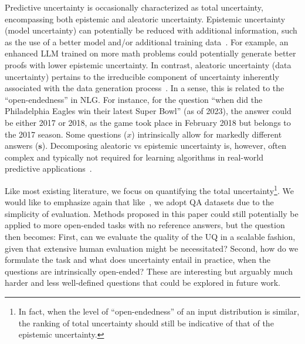 Predictive uncertainty is occasionally characterized as total uncertainty, encompassing both epistemic and aleatoric uncertainty. 
Epistemic uncertainty (model uncertainty) can potentially be reduced with additional information, such as the use of a better model and/or additional training data~\citep{hullermeier2021aleatoric,lahlou2023deup}. 
For example, an enhanced LLM trained on more math problems could potentially generate better proofs with lower epistemic uncertainty.
In contrast, aleatoric uncertainty (data uncertainty) pertains to the irreducible component of uncertainty inherently associated with the data generation process~\citep{10.1016/j.ins.2013.07.030}. 
In a sense, this is related to the ``open-endedness'' in NLG.
For instance, for the question ``when did the Philadelphia Eagles win their latest Super Bowl'' (as of 2023), the answer could be either 2017 or 2018, as the game took place in February 2018 but belongs to the 2017 season. 
Some questions ($x$) intrinsically allow for markedly different answers ($\mathbf{s}$). 
Decomposing aleatoric vs epistemic uncertainty is, however, often complex and typically not required for learning algorithms in real-world predictive applications~\citep{hullermeier2021aleatoric}.

Like most existing literature, we focus on quantifying the total uncertainty\footnote{In fact, when the level of ``open-endedness'' of an input distribution is similar, the ranking of total uncertainty should still be indicative of that of the epistemic uncertainty.}.
We would like to emphasize again that like~\cite{kuhn2023semantic}, we adopt QA datasets due to the simplicity of evaluation.
Methods proposed in this paper could still potentially be applied to more open-ended tasks with no reference answers, but the question then becomes: First, can we evaluate the quality of the UQ in a scalable fashion,  given that extensive human evaluation might be necessitated? 
Second, how do we formulate the task and what does uncertainty entail in practice, when the questions are intrinsically open-ended?
These are interesting but arguably much harder and less well-defined questions that could be explored in future work. 

